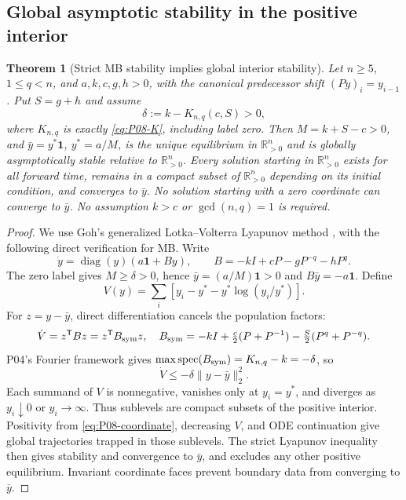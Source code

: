 \documentclass[11pt]{article}
\let\OriginalCite\cite
\renewcommand{\cite}[2][]{%
  \textcolor{CitationRed}{%
    \if\relax\detokenize{#1}\relax
      \OriginalCite{#2}%
    \else
      \OriginalCite[#1]{#2}%
    \fi}}
\newcommand{\R}{\mathbb{R}}
\newcommand{\one}{\mathbf{1}}
\newcommand{\PosOrth}{\R_{>0}^{n}}
\DeclareMathOperator{\spec}{spec}
\DeclareMathOperator{\diag}{diag}
\newtheorem{theorem}{Theorem}[section]
\theoremstyle{definition}
\theoremstyle{remark}
\begin{document}
\subsection{Global asymptotic stability in the positive interior}
\begin{theorem}[Strict MB stability implies global interior stability]
\label{thm:P08-global-interior}
Let $n\ge5$, $1\le q<n$, and $a,k,c,g,h>0$, with the canonical
predecessor shift $(Py)_i=y_{i-1}$. Put $S=g+h$ and assume
\[
 \delta:=k-K_{n,q}(c,S)>0,
\]
where $K_{n,q}$ is exactly \eqref{eq:P08-K}, including label zero.
Then $M=k+S-c>0$, and $\bar y=y^*\one$, $y^*=a/M$, is the unique
equilibrium in $\PosOrth$ and is globally asymptotically stable relative
to $\PosOrth$. Every solution starting in $\PosOrth$ exists for all
forward time, remains in a compact subset of $\PosOrth$ depending on
its initial condition, and converges to $\bar y$.
No solution starting with a zero coordinate can converge to $\bar y$.
No assumption $k>c$ or $\gcd(n,q)=1$ is required.
\end{theorem}
\begin{proof}
We use Goh's generalized Lotka--Volterra Lyapunov method
\cite{Goh1977}, with the following direct verification for MB. Write
\begin{equation}
 \dot y=\diag(y)(a\one+By),\qquad B=-kI+cP-gP^{-q}-hP^q.
 \label{eq:P08-global-field}
\end{equation}
The zero label gives $M\ge\delta>0$, hence
$\bar y=(a/M)\one>0$ and $B\bar y=-a\one$. Define
\begin{equation}
 V(y)=\sum_i[y_i-y^*-y^*\log(y_i/y^*)].
 \label{eq:P08-global-V}
\end{equation}
For $z=y-\bar y$, direct differentiation cancels the population factors:
\begin{equation}
 \dot V=z^{\mathsf T}Bz=z^{\mathsf T}B_{\rm sym}z,
 \quad B_{\rm sym}=-kI+\tfrac c2(P+P^{-1})-\tfrac S2(P^q+P^{-q}).
 \label{eq:P08-global-cancellation}
\end{equation}
P04's Fourier framework gives
$\max\spec(B_{\rm sym})=K_{n,q}-k=-\delta$, so
\begin{equation}
 \dot V\le-\delta\|y-\bar y\|_2^2.
 \label{eq:P08-global-decay}
\end{equation}
Each summand of $V$ is nonnegative, vanishes only at $y_i=y^*$,
and diverges as $y_i\downarrow0$ or $y_i\to\infty$.
Thus sublevels are compact subsets of the positive interior. Positivity
from \eqref{eq:P08-coordinate}, decreasing $V$, and ODE continuation
give global trajectories trapped in those sublevels. The strict Lyapunov
inequality then gives stability and convergence to $\bar y$, and excludes
any other positive equilibrium. Invariant coordinate faces prevent
boundary data from converging to $\bar y$.
\end{proof}
\end{document}
